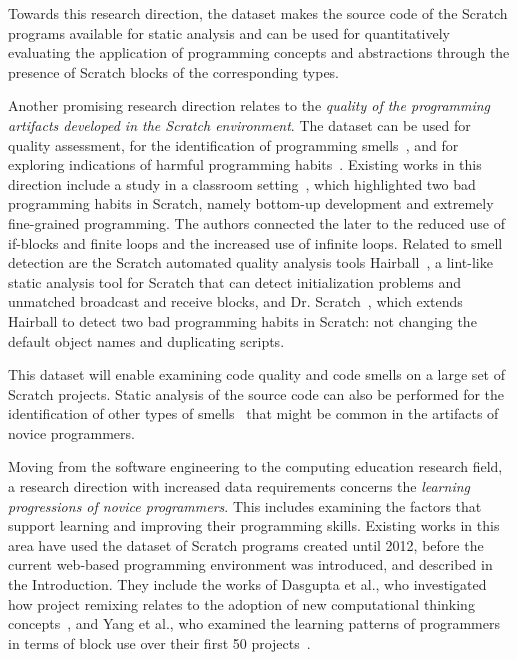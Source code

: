 \documentclass[10pt, conference]{IEEEtran}
\begin{document}
Towards this research direction, the dataset makes the source code of the Scratch programs available for static analysis and can be used for quantitatively evaluating the application of programming concepts and abstractions through the presence of Scratch blocks of the corresponding types.

Another promising research direction relates to the \textit{quality of the programming artifacts developed in the Scratch environment}.
The dataset can be used for quality assessment, for the identification of programming smells~\cite{Aivaloglou_2016}, and for exploring indications of harmful programming habits~\cite{Robles_2017}.
Existing works in this direction include a study in a classroom setting~\cite{Meerbaum_habits_2011}, which highlighted two bad programming habits in Scratch, namely bottom-up development and extremely fine-grained programming.
The authors connected the later to the reduced use of if-blocks and finite loops and the increased use of infinite loops.
Related to smell detection are the Scratch automated quality analysis tools Hairball~\cite{boe_hairball:_2013}, a lint-like static analysis tool for Scratch that can detect initialization problems and unmatched broadcast and receive blocks, and Dr. Scratch~\cite{moreno-leon_dr._2015}, which extends Hairball to detect two bad programming habits in Scratch: not changing the default object names and duplicating scripts.

This dataset will enable examining code quality and code smells on a large set of Scratch projects.
Static analysis of the source code can also be performed for the identification of other types of smells~\cite{fowler_refactoring:_1999} that might be common in the artifacts of novice programmers.

Moving from the software engineering to the computing education research field, a research direction with increased data requirements concerns the \textit{learning progressions of novice programmers}.
This includes examining the factors that support learning and improving their programming skills.
Existing works in this area have used the dataset of Scratch programs created until 2012, before the current web-based programming environment was introduced, and described in the Introduction.
They include the works of Dasgupta et al., who investigated how project remixing relates to the adoption of new computational thinking concepts~\cite{Dasgupta_2016}, and Yang et al., who examined the learning patterns of programmers in terms of block use over their first 50 projects~\cite{yang_2015}.
\end{document}
